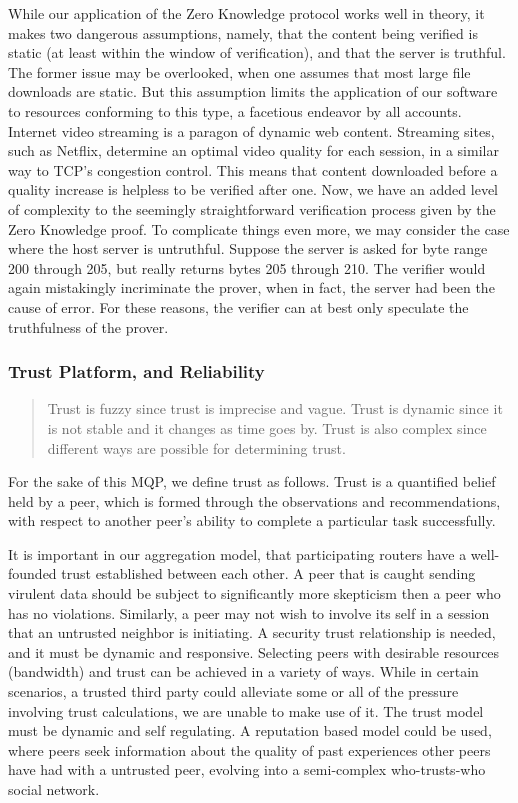 \documentclass[12pt]{article}
\begin{document}
		While our application of the Zero Knowledge protocol works well in theory, it makes two dangerous assumptions, namely, that the content being verified is static (at least within the window of verification), and that the server is truthful. The former issue may be overlooked, when one assumes that most large file downloads are static. But this assumption limits the application of our software to resources conforming to this type, a facetious endeavor by all accounts. Internet video streaming is a paragon of dynamic web content. Streaming sites, such as Netflix, determine an optimal video quality for each session, in a similar way to TCP's congestion control. This means that content downloaded before a quality increase is helpless to be verified after one. Now, we have an added level of complexity to the seemingly straightforward verification process given by the Zero Knowledge proof. To complicate things even more, we may consider the case where the host server is untruthful. Suppose the server is asked for byte range 200 through 205, but really returns bytes 205 through 210. The verifier would again mistakingly incriminate the prover, when in fact, the server had been the cause of error. For these reasons, the verifier can at best only speculate the truthfulness of the prover.

		\subsubsection{Trust Platform, and Reliability}

			\begin{quote}
			\centering
			Trust is fuzzy since trust is imprecise and vague. Trust is dynamic since it is not stable and it changes as time goes by. Trust is also complex since different ways are possible for determining trust. \cite{chang2006trust}
			\end{quote}

			For the sake of this MQP, we define trust as follows. Trust is a quantified belief held by a peer, which is formed through the observations and recommendations, with respect to another peer’s ability to complete a particular task successfully. 

			It is important in our aggregation model, that participating routers have a well-founded trust established between each other. A peer that is caught sending virulent data should be subject to significantly more skepticism then a peer who has no violations. Similarly, a peer may not wish to involve its self in a session that an untrusted neighbor is initiating. A security trust relationship is needed, and it must be dynamic and responsive. Selecting peers with desirable resources (bandwidth) and trust can be achieved in a variety of ways. While in certain scenarios, a trusted third party could alleviate some or all of the pressure involving trust calculations, we are unable to make use of it. The trust model must be dynamic and self regulating. A reputation based model could be used, where peers seek information about the quality of past experiences other peers have had with a untrusted peer, evolving into a semi-complex who-trusts-who social network.
\end{document}
